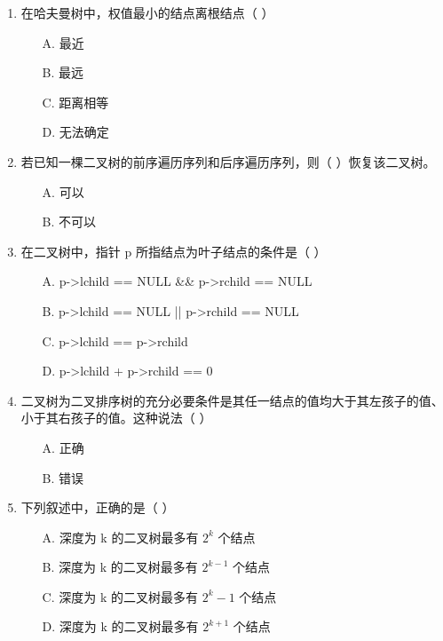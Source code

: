 \documentclass[12pt, a4paper]{article}
\begin{document}
\begin{enumerate}[label=\arabic*.]
	\item 在哈夫曼树中，权值最小的结点离根结点（ ）
	      \begin{enumerate}
		      \item[A.] 最近
		      \item[B.] 最远
		      \item[C.] 距离相等
		      \item[D.] 无法确定
	      \end{enumerate}

	\item 若已知一棵二叉树的前序遍历序列和后序遍历序列，则（ ）恢复该二叉树。
	      \begin{enumerate}
		      \item[A.] 可以
		      \item[B.] 不可以
	      \end{enumerate}

	\item 在二叉树中，指针 p 所指结点为叶子结点的条件是（ ）
	      \begin{enumerate}
		      \item[A.] p->lchild == NULL \&\& p->rchild == NULL
		      \item[B.] p->lchild == NULL || p->rchild == NULL
		      \item[C.] p->lchild == p->rchild
		      \item[D.] p->lchild + p->rchild == 0
	      \end{enumerate}

	\item 二叉树为二叉排序树的充分必要条件是其任一结点的值均大于其左孩子的值、小于其右孩子的值。这种说法（ ）
	      \begin{enumerate}
		      \item[A.] 正确
		      \item[B.] 错误
	      \end{enumerate}

	\item 下列叙述中，正确的是（ ）
	      \begin{enumerate}
		      \item[A.] 深度为 k 的二叉树最多有 $2^k$ 个结点
		      \item[B.] 深度为 k 的二叉树最多有 $2^{k-1}$ 个结点
		      \item[C.] 深度为 k 的二叉树最多有 $2^k - 1$ 个结点
		      \item[D.] 深度为 k 的二叉树最多有 $2^{k+1}$ 个结点
	      \end{enumerate}


\end{enumerate}
\end{document}
